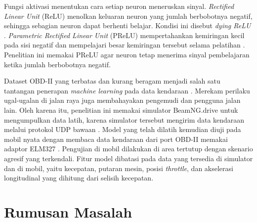 Fungsi aktivasi menentukan cara setiap neuron meneruskan sinyal. \textit{Rectified Linear Unit} (ReLU) menolkan keluaran neuron yang jumlah berbobotnya negatif, sehingga sebagian neuron dapat berhenti belajar. Kondisi ini disebut \textit{dying ReLU} \cite{Maas2013}. \textit{Parametric Rectified Linear Unit} (PReLU) mempertahankan kemiringan kecil pada sisi negatif dan mempelajari besar kemiringan tersebut selama pelatihan \cite{He2015}. Penelitian ini memakai PReLU agar neuron tetap menerima sinyal pembelajaran ketika jumlah berbobotnya negatif.

Dataset OBD-II yang terbatas dan kurang beragam menjadi salah satu tantangan penerapan \textit{machine learning} pada data kendaraan \cite{Michailidis2025}. Merekam perilaku ugal-ugalan di jalan raya juga membahayakan pengemudi dan pengguna jalan lain. Oleh karena itu, penelitian ini memakai simulator BeamNG.drive untuk mengumpulkan data latih, karena simulator tersebut mengirim data kendaraan melalui protokol UDP bawaan \cite{BeamNGProtocols}. Model yang telah dilatih kemudian diuji pada mobil nyata dengan membaca data kendaraan dari port OBD-II memakai adaptor ELM327 \cite{ELM327}. Pengujian di mobil dilakukan di area tertutup dengan skenario agresif yang terkendali. Fitur model dibatasi pada data yang tersedia di simulator dan di mobil, yaitu kecepatan, putaran mesin, posisi \textit{throttle}, dan akselerasi longitudinal yang dihitung dari selisih kecepatan.

\section{Rumusan Masalah}

